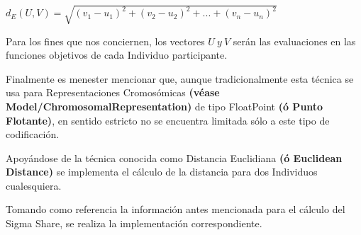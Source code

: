 \documentclass[letterpaper,10pt,english]{sphinxmanual}
\begin{document}
\begin{center}\(d_E(U,V) = \sqrt{(v_1 - u_1)^2 + (v_2 - u_2)^2 + ... + (v_n - u_n)^2}\)
\end{center}
\begin{DUlineblock}{0em}
\item[] Para los fines que nos conciernen, los vectores \(U\ y\ V\) serán las evaluaciones en las funciones objetivos
de cada Individuo participante.
\item[] 
\item[] Finalmente es menester mencionar que, aunque tradicionalmente esta técnica se usa para Representaciones Cromosómicas
\textbf{(véase Model/ChromosomalRepresentation)} de tipo FloatPoint \textbf{(ó Punto Flotante)}, en sentido estricto no se encuentra
limitada sólo a este tipo de codificación.
\end{DUlineblock}
\label{Model/SharingFunction/PhenotypicSimilarity/EuclideanDistance:module-Model.SharingFunction.PhenotypicSimilarity.EuclideanDistance}

\begin{fulllineitems}
\label{Model/SharingFunction/PhenotypicSimilarity/EuclideanDistance:Model.SharingFunction.PhenotypicSimilarity.EuclideanDistance.calculate_distance}
Apoyándose de la técnica conocida como Distancia Euclidiana 
\textbf{(ó Euclidean Distance)} se implementa el cálculo de la distancia 
para dos Individuos cualesquiera.

\end{fulllineitems}


\begin{fulllineitems}
\label{Model/SharingFunction/PhenotypicSimilarity/EuclideanDistance:Model.SharingFunction.PhenotypicSimilarity.EuclideanDistance.calculate_sigma_share}
Tomando como referencia la información antes mencionada para el cálculo del 
Sigma Share, se realiza la implementación correspondiente.

\end{fulllineitems}
\end{document}
